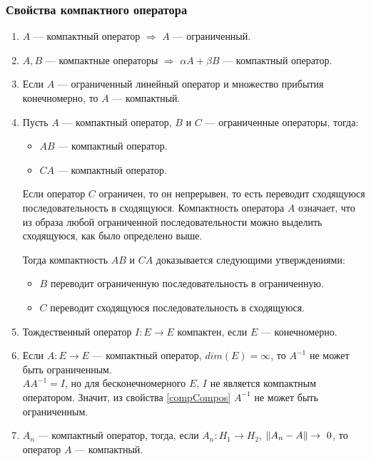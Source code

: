 \documentclass[12pt]{article}
\begin{document}
	\subsubsection{Свойства компактного оператора}
	\begin{enumerate}
		\item $A$ --- компактный оператор $\Rightarrow$ $A$ --- ограниченный.		
		\item $A, B$ --- компактные операторы $\Rightarrow$ $\alpha A + \beta B$ --- компактный оператор.		
		\item Если $A$ --- ограниченный линейный оператор и множество прибытия конечномерно, то $A$ --- компактный. \label{compArea}
		\item Пусть $A$ --- компактный оператор, $B$ и $C$ --- ограниченные операторы, тогда: \label{compCompos}
			\begin{itemize}
				\item $AB$ --- компактный оператор.
				\item $CA$ --- компактный оператор.
			\end{itemize}
		
			Если оператор $C$ ограничен, то он непрерывен, то есть переводит сходящуюся последовательность 
			в сходящуюся. Компактность оператора $A$ означает, что из образа любой ограниченной 
			последовательности можно выделить сходящуюся, как было определено выше.
		
			Тогда компактность $AB$ и $CA$ доказывается следующими утверждениями:
			\begin{itemize}
				\item $B$ переводит ограниченную последовательность в ограниченную.
				\item $C$ переводит сходящуюся последовательность в сходящуюся.
			\end{itemize}		
		\item Тождественный оператор $I:E\rightarrow E$ компактен, если $E$ --- конечномерно.
		\item Если $A:E \rightarrow E$ --- компактный оператор, $dim(E) = \infty$, то $A^{-1}$ не может быть ограниченным. \\

			$A A^{-1} = I$, но для бесконечномерного $E$, $I$ не является компактным оператором. Значит, 
			из свойства \ref{compCompos} $A^{-1}$ не может быть ограниченным.
		\item $A_n$ --- компактный оператор, тогда, если $A_n:H_1 \rightarrow H_2$, $\left\| A_n - A \right\| \rightarrow~0$, то 
		оператор $A$ --- компактный. \label{compLim}
		

\end{enumerate}
\end{document}
